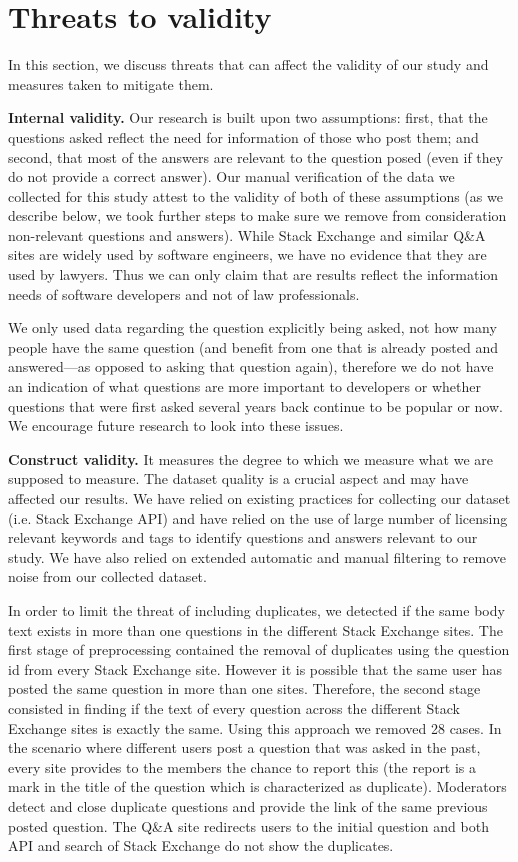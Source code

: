 \documentclass{elsarticle}
\begin{document}
\section{Threats to validity}

In this section, we discuss threats that can affect the validity of our study and measures taken to mitigate them. 

\textbf{Internal validity.} Our research is built upon two assumptions: first, that the questions asked reflect the need for information of those who post them; and second, that most of the answers are relevant to the question posed (even if they do not provide a correct answer). Our manual verification of the data we collected for this study attest to the validity of both of these assumptions (as we describe below, we took further steps to make sure we remove from consideration non-relevant questions and answers). While Stack Exchange and similar Q\&A sites are widely used by software engineers, we have no evidence that they are used by lawyers. Thus we can only claim that are results reflect the information needs of software developers and not of law professionals.

We only used data regarding the question explicitly being asked, not how many people have the same question (and benefit from one that is already posted and answered---as opposed to asking that question again), therefore we do not have an indication of what questions are more important to developers or whether questions that were first asked several years back continue to be popular or now. We encourage future research to look into these issues.

\textbf{Construct validity.} It measures the degree to which we measure what we are supposed to measure. The dataset quality is a crucial aspect and may have affected our results. We have relied on existing practices for collecting our dataset (i.e. Stack Exchange API) and have relied on the use of large number of licensing relevant keywords and tags to identify questions and answers relevant to our study. We have also relied on extended automatic and manual filtering to remove noise from our collected dataset.

In order to limit the threat of including duplicates, we detected if the same body text exists in more than one questions in the different Stack Exchange sites. The first stage of preprocessing contained the removal of duplicates using the question id from every Stack Exchange site. However it is possible that the same user has posted the same question in more than one sites. Therefore, the second stage consisted in finding if the text of every question across the different Stack Exchange sites is exactly the same. Using this approach we removed 28 cases. In the scenario where different users post a question that was asked in the past, every site provides to the members the chance to report this (the report is a mark in the title of the question which is characterized as duplicate). Moderators detect and close duplicate questions and provide the link of the same previous posted question. The Q\&A site redirects users to the initial question and both API and search of Stack Exchange do not show the duplicates.
\end{document}
